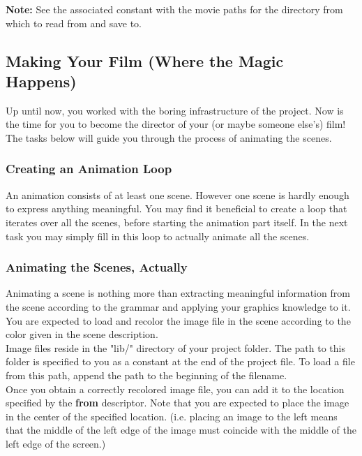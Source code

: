 \documentclass[a4paper]{article}
\begin{document}
	\noindent \textbf{Note:} See the associated constant with the movie paths for the directory from which to read from and save to. 
	
	\subsection{Making Your Film (Where the Magic Happens)}
	Up until now, you worked with the boring infrastructure of the project. Now is the time for you to become the director of your (or maybe someone else's) film! The tasks below will guide you through the process of animating the scenes.
 	
	\subsubsection{Creating an Animation Loop}
	An animation consists of at least one scene. However one scene is hardly enough to express anything meaningful. You may find it beneficial to create a loop that iterates over all the scenes, before starting the animation part itself. In the next task you may simply fill in this loop to actually animate all the scenes.
	
	\subsubsection{Animating the Scenes, Actually}
	Animating a scene is nothing more than extracting meaningful information from the scene according to the grammar and applying your graphics knowledge to it. You are expected to load and recolor the image file in the scene according to the color given in the scene description.\\
	
	Image files reside in the "lib/" directory of your project folder. The path to this folder is specified to you as a constant at the end of the project file. To load a file from this path, append the path to the beginning of the filename. \\
	
	Once you obtain a correctly recolored image file, you can add it to the location specified by the \textbf{from} descriptor. Note that you are expected to place the image in the center of the specified location. (i.e. placing an image to the left means that the middle of the left edge of the image must coincide with the middle of the left edge of the screen.)\\
	
\end{document}
